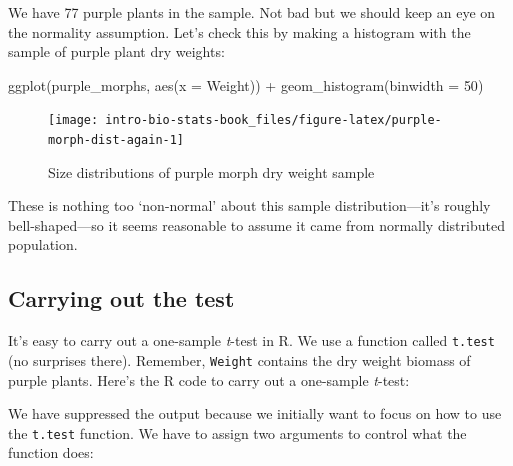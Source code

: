 \documentclass[
]{book}
\newenvironment{Shaded}{\begin{snugshade}}{\end{snugshade}}
\newcommand{\AttributeTok}[1]{\textcolor[rgb]{0.77,0.63,0.00}{#1}}
\newcommand{\DecValTok}[1]{\textcolor[rgb]{0.00,0.00,0.81}{#1}}
\newcommand{\FunctionTok}[1]{\textcolor[rgb]{0.00,0.00,0.00}{#1}}
\newcommand{\NormalTok}[1]{#1}
\newcommand{\SpecialCharTok}[1]{\textcolor[rgb]{0.00,0.00,0.00}{#1}}
\begin{document}
We have 77 purple plants in the sample. Not bad but we should keep an eye on the normality assumption. Let's check this by making a histogram with the sample of purple plant dry weights:

\begin{Shaded}
\begin{Highlighting}[]
\FunctionTok{ggplot}\NormalTok{(purple\_morphs, }\FunctionTok{aes}\NormalTok{(}\AttributeTok{x =}\NormalTok{ Weight)) }\SpecialCharTok{+} 
  \FunctionTok{geom\_histogram}\NormalTok{(}\AttributeTok{binwidth =} \DecValTok{50}\NormalTok{)}
\end{Highlighting}
\end{Shaded}

\begin{figure}

{\centering \texttt{[image: intro-bio-stats-book\_files/figure-latex/purple-morph-dist-again-1]} 

}

\caption{Size distributions of purple morph dry weight sample}\label{fig:purple-morph-dist-again}
\end{figure}

These is nothing too `non-normal' about this sample distribution---it's roughly bell-shaped---so it seems reasonable to assume it came from normally distributed population.

\hypertarget{carrying-out-the-test}{%
\subsection{Carrying out the test}\label{carrying-out-the-test}}

It's easy to carry out a one-sample \emph{t}-test in R. We use a function called \texttt{t.test} (no surprises there). Remember, \texttt{Weight} contains the dry weight biomass of purple plants. Here's the R code to carry out a one-sample \emph{t}-test:

\begin{Shaded}
\end{Shaded}

We have suppressed the output because we initially want to focus on how to use the \texttt{t.test} function. We have to assign two arguments to control what the function does:
\end{document}

